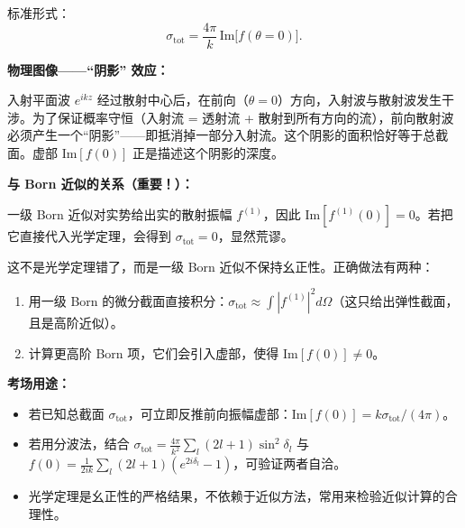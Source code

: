 \begin{derivationbox}

标准形式：
\[
\sigma_{\text{tot}} = \frac{4\pi}{k} \, \text{Im}\bigl[f(\theta = 0)\bigr].
\]

\textbf{物理图像——``阴影'' 效应：}

入射平面波 $e^{ikz}$ 经过散射中心后，在前向（$\theta = 0$）方向，入射波与散射波发生干涉。为了保证概率守恒（入射流 = 透射流 + 散射到所有方向的流），前向散射波必须产生一个``阴影''——即抵消掉一部分入射流。这个阴影的面积恰好等于总截面。虚部 $\text{Im}[f(0)]$ 正是描述这个阴影的深度。

\textbf{与 Born 近似的关系（重要！）：}

一级 Born 近似对实势给出实的散射振幅 $f^{(1)}$，因此 $\text{Im}[f^{(1)}(0)] = 0$。若把它直接代入光学定理，会得到 $\sigma_{\text{tot}} = 0$，显然荒谬。

这不是光学定理错了，而是一级 Born 近似不保持幺正性。正确做法有两种：
\begin{enumerate}
    \item 用一级 Born 的微分截面直接积分：$\sigma_{\text{tot}} \approx \int |f^{(1)}|^2 d\Omega$（这只给出弹性截面，且是高阶近似）。
    \item 计算更高阶 Born 项，它们会引入虚部，使得 $\text{Im}[f(0)] \neq 0$。
\end{enumerate}

\textbf{考场用途：}
\begin{itemize}
    \item 若已知总截面 $\sigma_{\text{tot}}$，可立即反推前向振幅虚部：$\text{Im}[f(0)] = k\sigma_{\text{tot}}/(4\pi)$。
    \item 若用分波法，结合 $\sigma_{\text{tot}} = \frac{4\pi}{k^2}\sum_l (2l+1)\sin^2\delta_l$ 与 $f(0) = \frac{1}{2ik}\sum_l (2l+1)(e^{2i\delta_l} - 1)$，可验证两者自洽。
    \item 光学定理是幺正性的严格结果，不依赖于近似方法，常用来检验近似计算的合理性。
\end{itemize}
\end{derivationbox}

